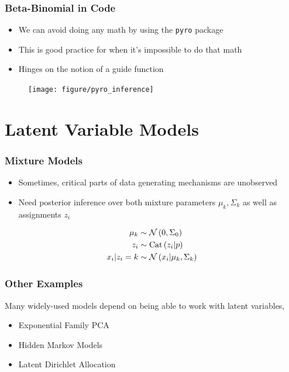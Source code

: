 \documentclass[10pt,mathserif]{beamer}
\begin{document}
\begin{frame}
  \frametitle{Beta-Binomial in Code}
  \begin{itemize}
  \item We can avoid doing any math by using the \texttt{pyro} package
  \item This is good practice for when it's impossible to do that math
  \item Hinges on the notion of a guide function
  \end{itemize} 
  \begin{figure}[ht]
    \centering
    \texttt{[image: figure/pyro\_inference]}
    \caption{\label{fig:pyro_model} }
\end{figure}
\end{frame}

\section{Latent Variable Models}
\label{sec:latent_variable_models}

\begin{frame}
  \frametitle{Mixture Models}
  \begin{itemize}
  \item Sometimes, critical parts of data generating mechanisms are unobserved
    \item Need posterior inference over both mixture parameters $\mu_k,
      \Sigma_k$ as well as assignments $z_i$
  \end{itemize}  
  \begin{align*}
    \mu_{k} &\sim \mathcal{N}\left(0, \Sigma_{0}\right) \\
    z_i &\sim \textnormal{Cat}\left(z_i \vert p\right) \\
    x_i \vert z_i = k &\sim \mathcal{N}\left(x_i \vert \mu_{k}, \Sigma_k\right)
  \end{align*}
\end{frame}

\begin{frame}
  \frametitle{Other Examples}
  Many widely-used models depend on being able to work with latent variables,
  \begin{itemize}
  \item Exponential Family PCA
  \item Hidden Markov Models
  \item Latent Dirichlet Allocation
  \end{itemize} 
\end{frame}
\end{document}
